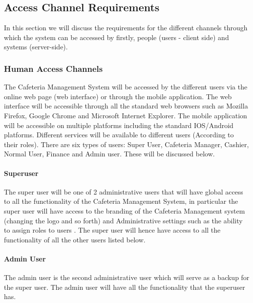 \documentclass[a4paper,12pt]{article}
\begin{document}
\subsection{Access Channel Requirements}
In this section we will discuss the requirements for the different channels through which the system can be accessed by firstly, people (users - client side) and systems (server-side).


\subsubsection{Human Access Channels}
The Cafeteria Management System will be accessed by the different users via the online web page (web interface) or through the mobile application. The web interface will be accessible through all the standard web browsers such as Mozilla Firefox, Google Chrome and Microsoft Internet Explorer. The mobile application will be accessible on multiple platforms including the standard IOS/Android platforms. Different services will be available to different users (According to their roles). There are six types of users: Super User, Cafeteria Manager, Cashier, Normal User, Finance and Admin user. These will be discussed below. \\

\paragraph{Superuser\\}
The super user will be one of 2 administrative users that will have global access to all the functionality of the Cafeteria Management System, in particular the super user will have access to the branding of the Cafeteria Management system (changing the logo and so forth) and Administrative settings such as the ability to assign roles to users  . The super user will hence have access to all the functionality of all the other users listed below.

\paragraph{Admin User\\}
The admin user is the second administrative user which will serve as a backup for the super user. The admin user will have all the functionality that the superuser has. 
\end{document}
